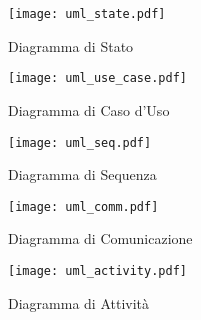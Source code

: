 \documentclass[12pt,a4paper]{article}
\begin{document}
\begin{figure}[p]
  \caption{Diagramma di Stato}
  \centering
  \texttt{[image: uml\_state.pdf]}
\end{figure}

\begin{figure}[p]
  \caption{Diagramma di Caso d'Uso}
  \centering
  \texttt{[image: uml\_use\_case.pdf]}
\end{figure}

\begin{figure}[p]
  \caption{Diagramma di Sequenza}
  \centering
  \texttt{[image: uml\_seq.pdf]}
\end{figure}

\begin{figure}[p]
  \caption{Diagramma di Comunicazione}
  \centering
  \texttt{[image: uml\_comm.pdf]}
\end{figure}

\begin{figure}[p]
  \caption{Diagramma di Attività}
  \centering
  \texttt{[image: uml\_activity.pdf]}
\end{figure}
\end{document}
